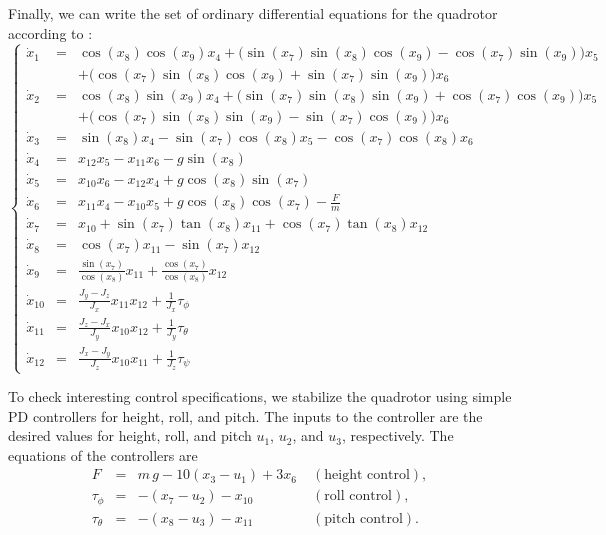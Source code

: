 \documentclass[EPiC]{easychair}
\begin{document}
Finally, we can write the set of ordinary differential equations for the quadrotor according to \cite[eq. (16) - (19)]{Beard2008}:
\[
\left\{
\begin{array}{lcl}
\dot{x}_1 & = & \cos(x_8)\cos(x_9)x_4 + \Big(\sin(x_7)\sin(x_8)\cos(x_9) - \cos(x_7)\sin(x_9)\Big)x_5 \\
& & + \Big(\cos(x_7)\sin(x_8)\cos(x_9) + \sin(x_7)\sin(x_9)\Big)x_6 \\
\dot{x}_2 & = & \cos(x_8)\sin(x_9)x_4 + \Big(\sin(x_7)\sin(x_8)\sin(x_9) + \cos(x_7)\cos(x_9)\Big)x_5 \\
& & + \Big(\cos(x_7)\sin(x_8)\sin(x_9) - \sin(x_7)\cos(x_9)\Big)x_6 \\
\dot{x}_3 & = & \sin(x_8)x_4 - \sin(x_7)\cos(x_8)x_5 - \cos(x_7)\cos(x_8)x_6 \\
\dot{x}_4 & = & x_{12}x_5 - x_{11}x_6 - g\sin(x_8) \\
\dot{x}_5 & = & x_{10}x_6 - x_{12}x_4 + g\cos(x_8)\sin(x_7) \\
\dot{x}_6 & = & x_{11}x_4 - x_{10}x_5 + g\cos(x_8)\cos(x_7) - \frac{F}{m} \\
\dot{x}_7 & = & x_{10} + \sin(x_7)\tan(x_8)x_{11} + \cos(x_7)\tan(x_8)x_{12} \\
\dot{x}_8 & = & \cos(x_7)x_{11} - \sin(x_7)x_{12} \\
\dot{x}_9 & = & \frac{\sin(x_7)}{\cos(x_8)}x_{11} + \frac{\cos(x_7)}{\cos(x_8)}x_{12} \\
\dot{x}_{10} & = & \frac{J_y - J_z}{J_x}x_{11}x_{12} + \frac{1}{J_x}\tau_\phi \\
\dot{x}_{11} & = & \frac{J_z - J_x}{J_y}x_{10}x_{12} + \frac{1}{J_y}\tau_\theta \\
\dot{x}_{12} & = & \frac{J_x - J_y}{J_z}x_{10}x_{11} + \frac{1}{J_z}\tau_\psi 
\end{array}
\right.
\]

To check interesting control specifications, we stabilize the quadrotor using simple PD controllers for height, roll, and pitch. The inputs to the controller are the desired values for height, roll, and pitch $u_1$, $u_2$, and $u_3$, respectively. The equations of the controllers are
\[
\begin{array}{lcll}
F & = & m \, g - 10(x_3 - u_1) + 3x_6 \; & (\text{height control}), \\
\tau_\phi & = & -(x_7 - u_2) - x_{10} & (\text{roll control}), \\
\tau_\theta & = & -(x_8 - u_3) - x_{11} & (\text{pitch control}).
\end{array}
\]
\end{document}
